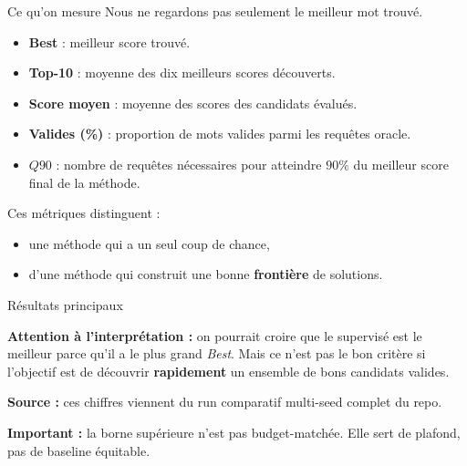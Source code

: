 \documentclass[aspectratio=169,10pt]{beamer}
\begin{document}
\begin{frame}{Ce qu'on mesure}
\justifying
Nous ne regardons pas seulement le meilleur mot trouvé.

\begin{itemize}
  \item \textbf{Best} : meilleur score trouvé.
  \item \textbf{Top-10} : moyenne des dix meilleurs scores découverts.
  \item \textbf{Score moyen} : moyenne des scores des candidats évalués.
  \item \textbf{Valides (\%)} : proportion de mots valides parmi les requêtes oracle.
  \item \textbf{\(Q90\)} : nombre de requêtes nécessaires pour atteindre
  \(90\%\) du meilleur score final de la méthode.
\end{itemize}

\vspace{0.5em}
Ces métriques distinguent :
\begin{itemize}
  \item une méthode qui a un seul coup de chance,
  \item d'une méthode qui construit une bonne \textbf{frontière} de solutions.
\end{itemize}
\end{frame}

\begin{frame}{Résultats principaux}
\centering
\small
{}

\vspace{0.8em}
\justifying
\textbf{Attention à l'interprétation :} on pourrait croire que le supervisé est
le meilleur parce qu'il a le plus grand \emph{Best}. Mais ce n'est pas le bon
critère si l'objectif est de découvrir \textbf{rapidement} un ensemble de
bons candidats valides.

\vspace{0.4em}
\textbf{Source :} ces chiffres viennent du run comparatif multi-seed complet du
repo.

\vspace{0.4em}
\textbf{Important :} la borne supérieure n'est pas budget-matchée. Elle sert
de plafond, pas de baseline équitable.
\end{frame}
\end{document}
